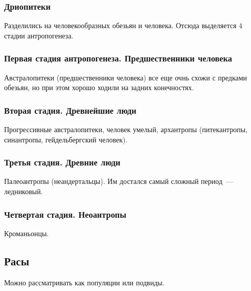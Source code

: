 \documentclass[12pt]{article}
\begin{document}
	\subsubsection{Дриопитеки}
	
	Разделились на человекообразных обезьян и человека. Отсюда выделяется 4 стадии антропогенеза.
	
	\subsubsection{Первая стадия антропогенеза. Предшественники человека}
	
	Австралопитеки (предшественники человека) все еще очнь схожи с предками обезьян, но при этом хорошо ходили на задних конечностях.
	
	\subsubsection{Вторая стадия. Древнейшие люди}
	
	Прогрессивные австралопитеки, человек умелый, архантропы (питекантропы, синантропы, гейдельбергский человек).
	
	\subsubsection{Третья стадия. Древние люди}
	
	Палеоантропы (неандертальцы). Им достался самый сложный период~--- ледниковый.
	
	\subsubsection{Четвертая стадия. Неоантропы}
	
	Кроманьонцы.
	
	\subsection{Расы}
	
	Можно рассматривать как популяции или подвиды.
	
\end{document}
